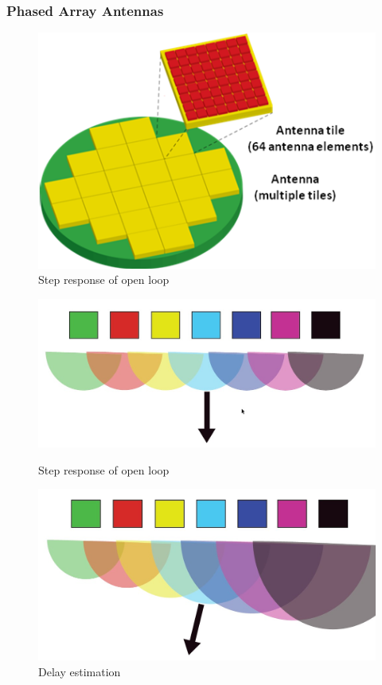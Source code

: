 \documentclass{beamer}
\begin{document}
\begin{frame}\frametitle{Phased Array Antennas}
		\begin{figure}
			\centering
			\includegraphics[width=0.3\linewidth]{images/satrax_antenna}
			\caption{Step response of open loop}
			\label{fig:bandwidth1}
		\end{figure}
		\begin{figure}[H]
			\begin{minipage}[t]{0.45\textwidth}
				\centering
				\includegraphics[width=\linewidth]{images/paa_straight}
				\caption{Step response of open loop}
				\label{fig:bandwidth1}
			\end{minipage}
				\hspace{\fill}
			\begin{minipage}[t]{0.45\textwidth}
				\centering
				\includegraphics[width=\linewidth]{images/paa_bend}
				\caption{Delay estimation}
				\label{fig:bandwidth2}
			\end{minipage}
		\end{figure}
\end{frame}
\end{document}
